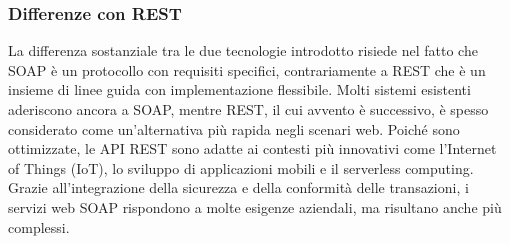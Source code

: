 \subsubsection{Differenze con REST}
La differenza sostanziale tra le due tecnologie introdotto risiede nel fatto che SOAP è un protocollo con requisiti specifici, contrariamente a REST che è un insieme di linee guida con implementazione flessibile. Molti sistemi esistenti aderiscono ancora a SOAP, mentre REST, il cui avvento è successivo, è spesso considerato come un'alternativa più rapida negli scenari web. Poiché sono ottimizzate, le API REST sono adatte ai contesti più innovativi come l'Internet of Things (IoT), lo sviluppo di applicazioni mobili e il serverless computing. Grazie all'integrazione della sicurezza e della conformità delle transazioni, i servizi web SOAP rispondono a molte esigenze aziendali, ma risultano anche più complessi.